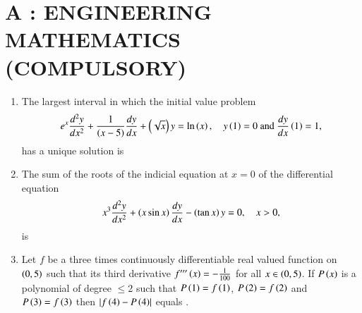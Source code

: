 \documentclass[a4paper,10pt]{article}
\begin{document}
\section*{A : ENGINEERING MATHEMATICS (COMPULSORY)}
\begin{enumerate}
    \item The largest interval in which the initial value problem
    \begin{align*}
        e^x \frac{d^2 y}{dx^2} + \frac{1}{\left(x-5\right)}\frac{dy}{dx} + \left(\sqrt{x}\right)y = \ln\left(x\right), \quad y\left(1\right) = 0 \text{ and } \frac{dy}{dx}\left(1\right) = 1,
    \end{align*}
    has a unique solution is
    \hfill{}
    \begin{enumerate}[label=\Alph*)]
    \end{enumerate}

    \item The sum of the roots of the indicial equation at $x=0$ of the differential equation
    \begin{align*}
        x^3 \frac{d^2 y}{dx^2} + \left(x \sin x\right)\frac{dy}{dx} - \left(\tan x\right)y = 0, \quad x > 0,
    \end{align*}
    is
    \hfill{}
    \begin{enumerate}[label=\Alph*)]
    \end{enumerate}

    \item Let $f$ be a three times continuously differentiable real valued function on $\left(0, 5\right)$ such that its third derivative $f'''\left(x\right) = -\frac{1}{100}$ for all $x \in \left(0, 5\right)$. If $P\left(x\right)$ is a polynomial of degree $\le 2$ such that $P\left(1\right) = f\left(1\right)$, $P\left(2\right) = f\left(2\right)$ and $P\left(3\right) = f\left(3\right)$ then $\left\vert f\left(4\right) - P\left(4\right)\right\vert$ equals \underline{\hspace{2cm}}.
    \hfill{}


\end{enumerate}
\end{document}
